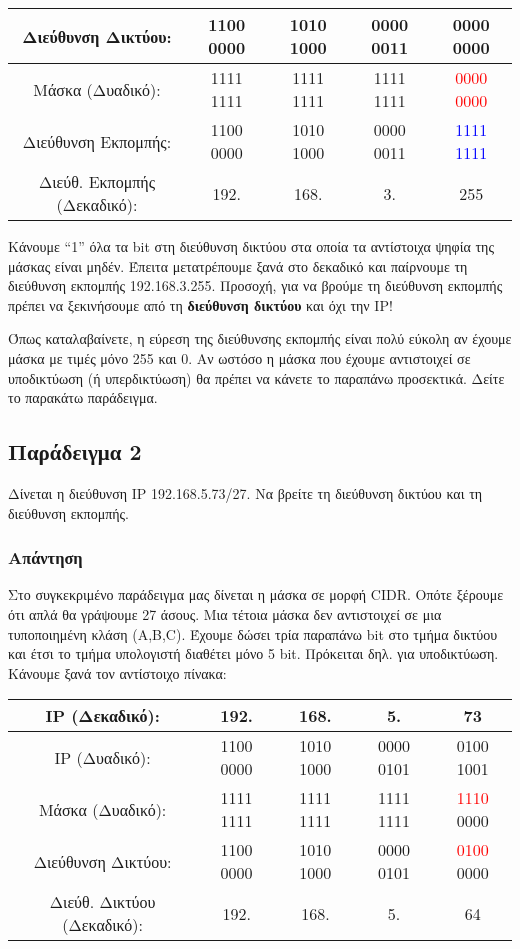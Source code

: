 \begin{center}
\fontsize{9}{11}
\ttfamily
\begin{tabular}{|c|c|c|c|c|}
\hline
 Διεύθυνση Δικτύου: & 1100 0000 & 1010 1000 & 0000 0011 & 0000 0000\\ 
\hline
Μάσκα (Δυαδικό): & 1111 1111 & 1111 1111 & 1111 1111 & \textcolor{red}{0000 0000} \\
\hline
Διεύθυνση Εκπομπής: & 1100 0000 & 1010 1000 & 0000 0011 & \textcolor{blue}{1111 1111}\\
 \hline
 Διεύθ. Εκπομπής (Δεκαδικό): & 192. & 168. & 3. & 255\\
 \hline
\end{tabular}
\normalfont
\end{center}

Κάνουμε ``1'' όλα τα bit στη διεύθυνση δικτύου στα οποία τα αντίστοιχα ψηφία της μάσκας είναι μηδέν. Έπειτα μετατρέπουμε ξανά στο δεκαδικό και παίρνουμε τη διεύθυνση εκπομπής 192.168.3.255. Προσοχή, για να βρούμε τη διεύθυνση εκπομπής πρέπει να ξεκινήσουμε από τη \textbf{διεύθυνση δικτύου} και όχι την IP!

Όπως καταλαβαίνετε, η εύρεση της διεύθυνσης εκπομπής είναι πολύ εύκολη αν έχουμε μάσκα με τιμές μόνο 255 και 0. Αν ωστόσο η μάσκα που έχουμε αντιστοιχεί σε υποδικτύωση (ή υπερδικτύωση) θα πρέπει να κάνετε το παραπάνω προσεκτικά. Δείτε το παρακάτω παράδειγμα.

\subsection*{Παράδειγμα 2}

Δίνεται η διεύθυνση IP 192.168.5.73/27. Να βρείτε τη διεύθυνση δικτύου και τη διεύθυνση εκπομπής.

\subsubsection*{Απάντηση}

Στο συγκεκριμένο παράδειγμα μας δίνεται η μάσκα σε μορφή CIDR.  Οπότε ξέρουμε ότι απλά θα γράψουμε 27 άσους. Μια τέτοια μάσκα δεν αντιστοιχεί σε μια τυποποιημένη κλάση (A,B,C). Έχουμε δώσει τρία παραπάνω bit στο τμήμα δικτύου και έτσι το τμήμα υπολογιστή διαθέτει μόνο 5 bit. Πρόκειται δηλ. για υποδικτύωση. Κάνουμε ξανά τον αντίστοιχο πίνακα:

\begin{center}
\fontsize{9}{11}
\ttfamily
\begin{tabular}{|c|c|c|c|c|}
\hline
 IP (Δεκαδικό): & 192. & 168. & 5. & 73 \\ 
\hline
 IP (Δυαδικό): & 1100 0000 & 1010 1000 & 0000 0101 & 0100 1001\\
\hline
 Μάσκα (Δυαδικό): & 1111 1111 & 1111 1111 & 1111 1111 & \textcolor{red}{1110} 0000\\
 \hline
 Διεύθυνση Δικτύου: & 1100 0000 & 1010 1000 & 0000 0101 & \textcolor{red}{0100} 0000\\
 \hline
 Διεύθ. Δικτύου (Δεκαδικό): & 192. & 168. & 5. & 64\\
 \hline 
\end{tabular}
\normalfont
\end{center}

